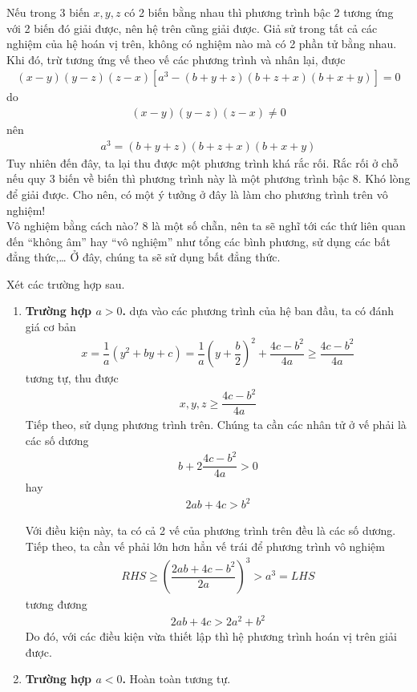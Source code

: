\documentclass[a4paper,oneside]{book}
\numberwithin{equation}{chapter}
\begin{document}
Nếu trong 3 biến $x,y,z$ có 2 biến bằng nhau thì phương trình bậc 2 tương ứng với 2 biến đó giải được, nên hệ trên cũng giải được. Giả sử trong tất cả các nghiệm của hệ hoán vị trên, không có nghiệm nào mà có 2 phần tử bằng nhau. Khi đó, trừ tương ứng vế theo vế các phương trình và nhân lại, được
\begin{align}
\left( {x - y} \right)\left( {y - z} \right)\left( {z - x} \right)\left[ {{a^3} - \left( {b + y + z} \right)\left( {b + z + x} \right)\left( {b + x + y} \right)} \right] = 0
\end{align}
do 
\begin{align}
\left( {x - y} \right)\left( {y - z} \right)\left( {z - x} \right) \ne 0
\end{align}
nên
\begin{align}
{a^3} = \left( {b + y + z} \right)\left( {b + z + x} \right)\left( {b + x + y} \right)
\end{align}
Tuy nhiên đến đây, ta lại thu được một phương trình khá rắc rối. Rắc rối ở chỗ nếu quy 3 biến về  biến thì phương trình này là một phương trình bậc 8. Khó lòng để giải được. Cho nên, có một ý tưởng ở đây là làm cho phương trình trên vô nghiệm!\\

Vô nghiệm bằng cách nào? 8 là một số chẵn, nên ta sẽ nghĩ tới các thứ liên quan đến ``không âm'' hay ``vô nghiệm'' như tổng các bình phương, sử dụng các bất đẳng thức,\ldots 
Ở đây, chúng ta sẽ sử dụng bất đẳng thức.

Xét các trường hợp sau.
\begin{enumerate}
\item \textbf{Trường hợp $a>0$.} dựa vào các phương trình của hệ ban đầu, ta có đánh giá cơ bản
\begin{align}
x = \dfrac{1}{a}\left( {{y^2} + by + c} \right) = \dfrac{1}{a}{\left( {y + \dfrac{b}{2}} \right)^2} + \dfrac{{4c - {b^2}}}{{4a}} \ge \dfrac{{4c - {b^2}}}{{4a}}
\end{align}
tương tự, thu được 
\begin{align}
x,y,z \ge \dfrac{{4c - {b^2}}}{{4a}}
\end{align}
Tiếp theo, sử dụng phương trình trên. Chúng ta cần các nhân tử ở vế phải là các số dương
\begin{align}
b + 2\dfrac{{4c - {b^2}}}{{4a}} > 0
\end{align}
hay 
\begin{align}
2ab + 4c > {b^2}
\end{align}

Với điều kiện này, ta có cả 2 vế của phương trình trên đều là các số dương. Tiếp theo, ta cần vế phải lớn hơn hẳn vế trái để phương trình vô nghiệm
\begin{align}
RHS \ge {\left( {\dfrac{{2ab + 4c - {b^2}}}{{2a}}} \right)^3} > {a^3} = LHS
\end{align}
tương đương 
\begin{align}
2ab + 4c > 2{a^2} + {b^2}
\end{align}
Do đó, với các điều kiện vừa thiết lập thì hệ phương trình hoán vị trên giải được.
\item \textbf{Trường hợp $a<0$.} Hoàn toàn tương tự.
\end{enumerate}
\end{document}
